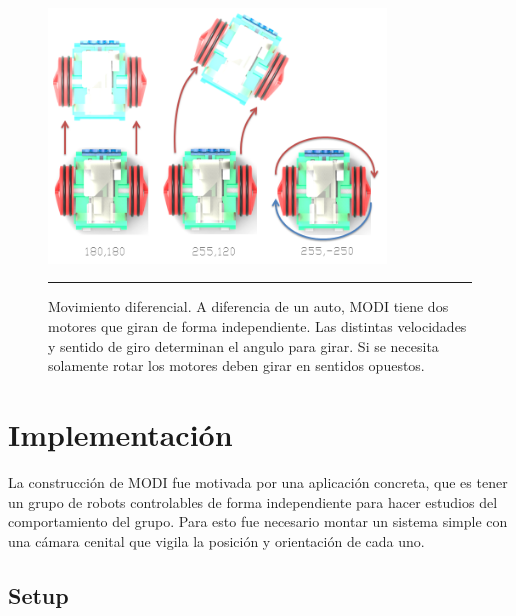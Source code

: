 \begin{figure}[htbp]
	\centering
		\includegraphics[width=0.8\textwidth]{./Figures/MODI/pwm.png}
		\rule{35em}{0.5pt}
	\caption[Señal pwm]{Movimiento diferencial. A diferencia de un auto, MODI tiene dos motores que giran de forma independiente. Las distintas velocidades y sentido de giro determinan el angulo para girar. Si se necesita solamente rotar los motores deben girar en sentidos opuestos.}
	\label{fig:pwm}
\end{figure}

\section{Implementación}
La construcción de MODI fue motivada por una aplicación concreta, que es tener un grupo de robots controlables de forma independiente para hacer estudios del comportamiento del grupo. Para esto fue necesario montar un sistema simple con una cámara cenital que vigila  la posición y orientación de cada uno.

\subsection{Setup}

